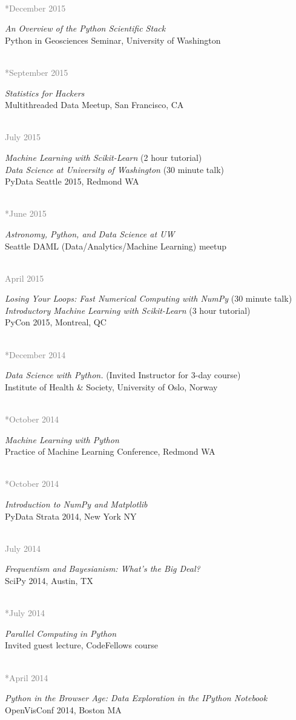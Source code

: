 \documentclass{article} %
\newlength\sidebarwidth
\newcommand{\dateonly}[2][]
	 {\begin{minipage}{\textwidth}
	 \vspace*{.4\baselineskip}
         \nopagebreak\hspace{0in}%
         \nopagebreak\begin{minipage}[t]{\sidebarwidth - .2cm}
         \raggedleft {~}
         {\\[-\baselineskip] \textcolor{gray}{\footnotesize #1}}
	 \end{minipage}%
	 \hfill
	 \begin{minipage}[t]{\linewidth - \sidebarwidth}
	 #2%
	 \end{minipage}%
	 \vspace*{.2\baselineskip plus 1\baselineskip minus
	 .2\baselineskip}%
	 \end{minipage}}
\begin{document}
  \dateonly[**December 2015]{
      {\it An Overview of the Python Scientific Stack}\\
      Python in Geosciences Seminar, University of Washington
  }

  \dateonly[**September 2015]{
      {\it Statistics for Hackers}\\
      Multithreaded Data Meetup, San Francisco, CA
  }

  \dateonly[July 2015]{
    {\it Machine Learning with Scikit-Learn} (2 hour tutorial)\\
    {\it Data Science at University of Washington} (30 minute talk)\\
    PyData Seattle 2015, Redmond WA
  }

  \dateonly[**June 2015]{
    {\it Astronomy, Python, and Data Science at UW}\\
    Seattle DAML (Data/Analytics/Machine Learning) meetup
  }

  \dateonly[April 2015]{
    {\it Losing Your Loops: Fast Numerical Computing with NumPy} (30 minute talk)\\
    {\it Introductory Machine Learning with Scikit-Learn} (3 hour tutorial)\\
    PyCon 2015, Montreal, QC
  }

  \dateonly[**December 2014]{
    {\it Data Science with Python.} (Invited Instructor for 3-day course)\\
    Institute of Health \& Society, University of Oslo, Norway
  }

  \dateonly[**October 2014]{
    {\it Machine Learning with Python}\\
    Practice of Machine Learning Conference, Redmond WA
  }

  \dateonly[**October 2014]{
    {\it Introduction to NumPy and Matplotlib}\\
    PyData \@ Strata 2014, New York NY
  }

  \dateonly[July 2014]{
    {\it Frequentism and Bayesianism: What's the Big Deal?}\\
    SciPy 2014, Austin, TX
  }

  \dateonly[**July 2014]{
    {\it Parallel Computing in Python}\\
    Invited guest lecture, CodeFellows course
  }

  \dateonly[**April 2014]{
    {\it Python in the Browser Age: Data Exploration in the IPython Notebook}\\
    OpenVisConf 2014, Boston MA
  }
\end{document}
